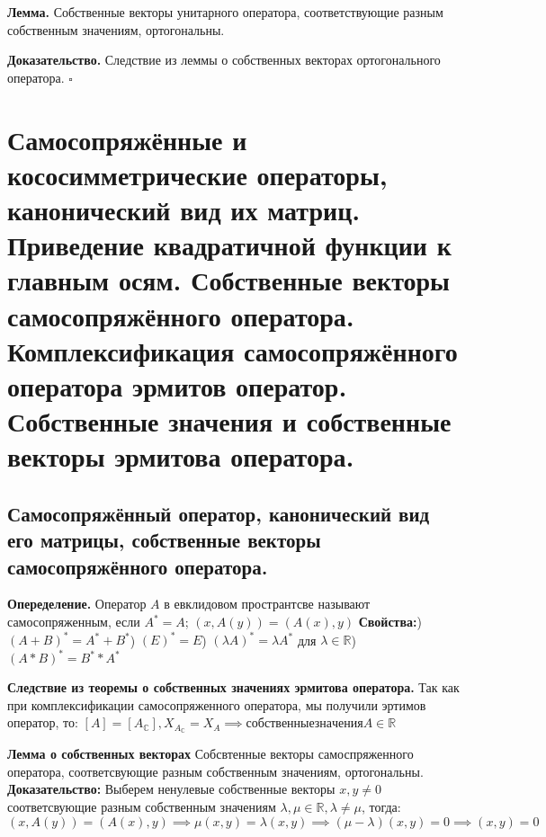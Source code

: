 \documentclass[12pt]{article}
\begin{document}
\textbf{Лемма.} Собственные векторы унитарного оператора, соответствующие
 разным собственным значениям, ортогональны.

 \textbf{Доказательство.}
 Следствие из леммы о собственных векторах ортогонального оператора. $\square$
 
 \section{Самосопряжённые и кососимметрические операторы, канонический вид их матриц. Приведение квадратичной функции к главным осям. Собственные векторы самосопряжённого оператора. Комплексификация самосопряжённого оператора эрмитов оператор. Собственные значения и собственные векторы эрмитова оператора.}

 \subsection*{Самосопряжённый оператор, канонический вид его матрицы, собственные векторы самосопряжённого оператора. } \newline

\textbf{Опеределение.} Оператор $A$ в евклидовом пространтсве называют самосопряженным, если $A^* = A$; $(x, A(y)) = (A(x), y)$\newline
\textbf{Свойства:}) $(A+B)^* = A^*+B^*$) $(E)^* = E$) $(\lambda A)^* =\lambda  A^*$ для $\lambda \in \mathbb{R}$) $(A*B)^* = B^**A^*$\[\]

\textbf{Следствие из теоремы о собственных значениях эрмитова оператора.}
Так как при комплексификации самосопряженного оператора, мы получили эртимов оператор, то:\newline
$[A] = [A_\mathbb{C}], X_{A_\mathbb{C}} = X_A \implies собственные значения A \in \mathbb{R}$\[\]

\textbf{Лемма о собственных векторах}\newline
Собсвтенные векторы самоспряженного оператора, соответсвующие разным собственным значениям, ортогональны. \newline
\textbf{Доказательство:} \newline
Выберем ненулевые собственные векторы $x, y \ne 0$ соответсвующие разным собственным значениям $\lambda, \mu \in \mathbb{R}, \lambda \ne \mu$, тогда: \newline
$(x, A(y)) = (A(x), y) \implies \mu(x,y) = \lambda(x,y) \implies (\mu - \lambda)(x,y)=0 \implies (x,y) = 0$\[\]
\end{document}
